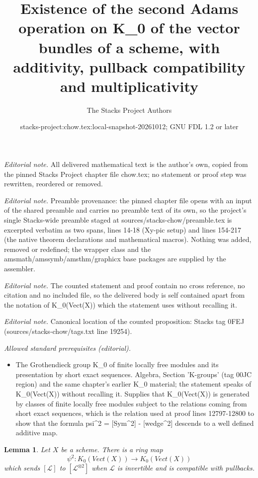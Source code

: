 \documentclass[10pt,a4paper]{amsart}
\title{Existence of the second Adams operation on K\_0 of the vector bundles of a scheme, with additivity, pullback compatibility and multiplicativity}
\author{The Stacks Project Authors}
\date{stacks-project:chow.tex:local-snapshot-20261012; GNU FDL 1.2 or later}
\theoremstyle{plain}
\newtheorem{lemma}[subsection]{Lemma}
\theoremstyle{definition}
\theoremstyle{remark}
\numberwithin{equation}{subsection}
\begin{document}
\maketitle
\noindent\textit{Editorial note.} All delivered mathematical text is the author's own, copied from the pinned Stacks Project chapter file chow.tex; no statement or proof step was rewritten, reordered or removed.\par\medskip
\noindent\textit{Editorial note.} Preamble provenance: the pinned chapter file opens with an input of the shared preamble and carries no preamble text of its own, so the project's single Stacks-wide preamble staged at sources/stacks-chow/preamble.tex is excerpted verbatim as two spans, lines 14-18 (Xy-pic setup) and lines 154-217 (the native theorem declarations and mathematical macros). Nothing was added, removed or redefined; the wrapper class and the amsmath/amssymb/amsthm/graphicx base packages are supplied by the assembler.\par\medskip
\noindent\textit{Editorial note.} The counted statement and proof contain no cross reference, no citation and no included file, so the delivered body is self contained apart from the notation of K\_0(Vect(X)) which the statement uses without recalling it.\par\medskip
\noindent\textit{Editorial note.} Canonical location of the counted proposition: Stacks tag 0FEJ (sources/stacks-chow/tags.txt line 19254).\par\medskip
\noindent\textit{Allowed standard prerequisites (editorial).}\begin{itemize}
\item The Grothendieck group K\_0 of finite locally free modules and its presentation by short exact sequences. Algebra, Section 'K-groups' (tag 00JC region) and the same chapter's earlier K\_0 material; the statement speaks of K\_0(Vect(X)) without recalling it. Supplies that K\_0(Vect(X)) is generated by classes of finite locally free modules subject to the relations coming from short exact sequences, which is the relation used at proof lines 12797-12800 to show that the formula psi\textasciicircum{}2 = [Sym\textasciicircum{}2] - [wedge\textasciicircum{}2] descends to a well defined additive map.
\end{itemize}\medskip
\begin{lemma}
\label{lemma-second-adams-operator}
Let $X$ be a scheme. There is a ring map
$$
\psi^2 :
K_0(\textit{Vect}(X))
\longrightarrow
K_0(\textit{Vect}(X))
$$
which sends $[\mathcal{L}]$ to $[\mathcal{L}^{\otimes 2}]$
when $\mathcal{L}$ is invertible and is compatible with pullbacks.
\end{lemma}
\end{document}
